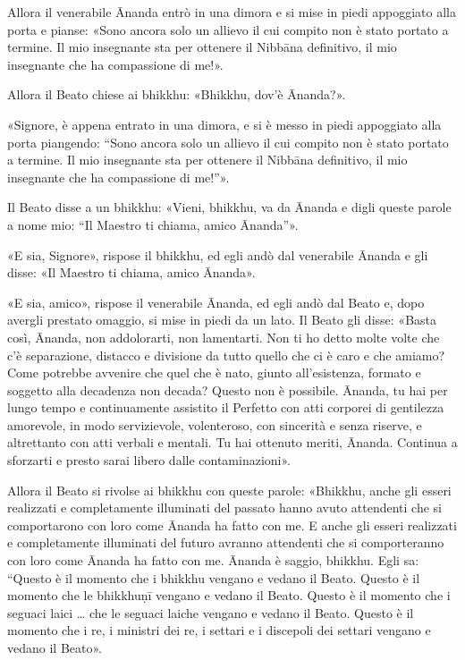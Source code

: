 Allora il venerabile Ānanda entrò in una dimora e si mise in piedi
appoggiato alla porta e pianse: «Sono ancora solo un allievo il cui
compito non è stato portato a termine. Il mio insegnante sta per
ottenere il Nibbāna definitivo, il mio insegnante che ha compassione di
me!».


Allora il Beato chiese ai bhikkhu: «Bhikkhu, dov’è Ānanda?».


«Signore, è appena entrato in una dimora, e si è messo in piedi
appoggiato alla porta piangendo: “Sono ancora solo un allievo il cui
compito non è stato portato a termine. Il mio insegnante sta per
ottenere il Nibbāna definitivo, il mio insegnante che ha compassione di
me!”».


Il Beato disse a un bhikkhu: «Vieni, bhikkhu, va da Ānanda e digli
queste parole a nome mio: “Il Maestro ti chiama, amico Ānanda”».


«E sia, Signore», rispose il bhikkhu, ed egli andò dal venerabile Ānanda
e gli disse: «Il Maestro ti chiama, amico Ānanda».


«E sia, amico», rispose il venerabile Ānanda, ed egli andò dal Beato e,
dopo avergli prestato omaggio, si mise in piedi da un lato. Il Beato gli
disse: «Basta così, Ānanda, non addolorarti, non lamentarti. Non ti ho
detto molte volte che c’è separazione, distacco e divisione da tutto
quello che ci è caro e che amiamo? Come potrebbe avvenire che quel che è
nato, giunto all’esistenza, formato e soggetto alla decadenza non
decada? Questo non è possibile. Ānanda, tu hai per lungo tempo e
continuamente assistito il Perfetto con atti corporei di gentilezza
amorevole, in modo servizievole, volenteroso, con sincerità e senza
riserve, e altrettanto con atti verbali e mentali. Tu hai ottenuto
meriti, Ānanda. Continua a sforzarti e presto sarai libero dalle
contaminazioni».


Allora il Beato si rivolse ai bhikkhu con queste parole: «Bhikkhu, anche
gli esseri realizzati e completamente illuminati del passato hanno avuto
attendenti che si comportarono con loro come Ānanda ha fatto con me. E
anche gli esseri realizzati e completamente illuminati del futuro
avranno attendenti che si comporteranno con loro come Ānanda ha fatto
con me. Ānanda è saggio, bhikkhu. Egli sa: “Questo è il momento che i
bhikkhu vengano e vedano il Beato. Questo è il momento che le bhikkhuṇī
vengano e vedano il Beato. Questo è il momento che i seguaci laici … che
le seguaci laiche vengano e vedano il Beato. Questo è il momento che i
re, i ministri dei re, i settari e i discepoli dei settari vengano e
vedano il Beato».


